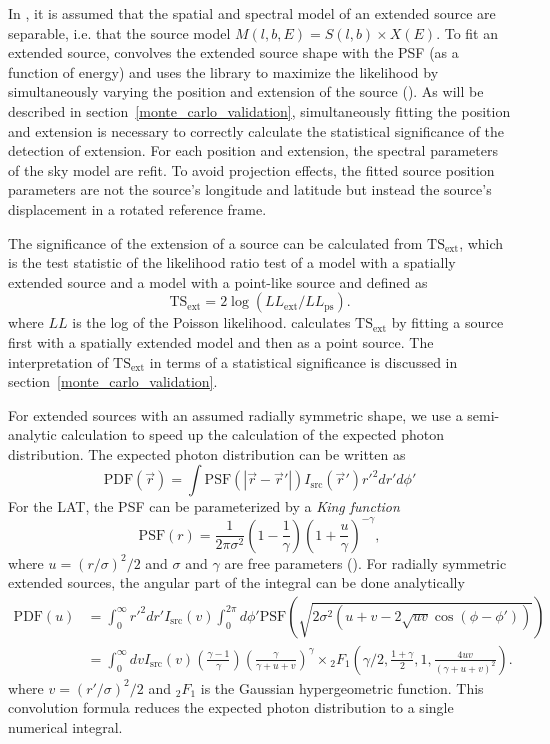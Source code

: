 \documentclass[12pt,preprint]{aastex}
\newcommand{\tsext}{{\ensuremath{\text{TS}_{\text{ext}}}}\xspace}
\newcommand{\loglikelihood}{\ensuremath{LL}\xspace}
\newcommand{\pointlike}{\text{\em pointlike}\xspace}
\newcommand{\minuit}{\text{\em Minuit}\xspace}
\begin{document}
In \pointlike, it is assumed that the spatial and spectral
model of an extended source are separable, i.e. that the source
model $M(l,b,E)=S(l,b)\times X(E)$.  To fit an extended source,
\pointlike convolves the extended source shape with the PSF (as a
function of energy) and uses the \minuit library to maximize the
likelihood by simultaneously varying the position and extension of
the source (\cite{minuit_documentation}).  As will be described in
section~\ref{monte_carlo_validation}, simultaneously fitting the position
and extension is necessary to correctly calculate the statistical
significance of the detection of extension.  For each position and
extension, the spectral parameters of the sky model are refit.  To avoid
projection effects, the fitted source position parameters are not the
source's longitude and latitude but instead the source's displacement
in a rotated reference frame.

The significance of the extension of a source can be calculated
from \tsext, which 
is the test statistic of the likelihood ratio test of
a model with a spatially extended source and a model
with a point-like source and defined as
\begin{equation}
  \tsext=2\log(\loglikelihood_\text{ext}/\loglikelihood_\text{ps}).
\end{equation}
where \loglikelihood is the log of the Poisson likelihood.
\pointlike calculates \tsext by fitting a source first with a spatially
extended model and then as a point source.  The interpretation
of \tsext in terms of a statistical significance is discussed in
section~\ref{monte_carlo_validation}.

For extended sources with an assumed radially symmetric shape,
we use a semi-analytic calculation to speed up the calculation of
the expected photon distribution. The expected photon 
distribution can be written as
\begin{equation}
  \text{PDF}(\vec r) = \int  \text{PSF}(|\vec r - \vec r'|)I_\text{src}(\vec r') r'^2 dr' d\phi'
\end{equation}
For the LAT, the PSF can be parameterized by a {\em King function}
\begin{equation}
  \text{PSF}(r) = 
  \frac{1}{2\pi\sigma^2}
  \left(1-\frac{1}{\gamma}\right)
  \left(1+\frac{u}{\gamma}\right)^{-\gamma},
\end{equation}
where $u=(r/\sigma)^2/2$ and $\sigma$ and $\gamma$ are free parameters
(\cite{matthew_kerr_thesis}).  For radially symmetric extended sources,
the angular part of the integral can be done analytically
\begin{align}
  \text{PDF}(u) & = \int_0^\infty r'^2 dr'
  I_\text{src}(v) 
  \int_0^{2\pi} d\phi' 
  \text{PSF}(\sqrt{2\sigma^2(u+v-2\sqrt{uv}\cos(\phi-\phi'))})
  \\
  & = \int_0^\infty dv
  I_\text{src}(v) 
  \left(\frac{\gamma-1}{\gamma}\right)
  \left( \frac{\gamma}{\gamma + u + v}\right)^\gamma 
  \times {}_2F_1 \left(\gamma/2,\frac{1+\gamma}{2},1,\frac{4uv}{(\gamma+u+v)^2}\right).
\end{align}
where $v=(r'/\sigma)^2/2$ and ${}_2F_1$ is the Gaussian hypergeometric
function.  This convolution formula reduces the expected photon
distribution to a single numerical integral.
\end{document}
